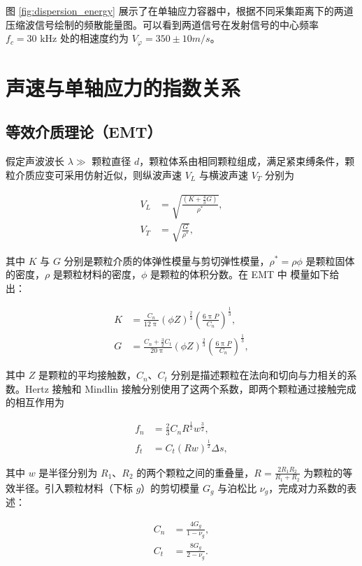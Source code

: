 图 \ref{fig:dispersion_energy} 展示了在单轴应力容器中，根据不同采集距离下的两道压缩波信号绘制的频散能量图。可以看到两道信号在发射信号的中心频率 $f_{c} = 30\text{ kHz}$ 处的相速度约为 $V_{\varphi} = 350\pm 10\unit{m/s}$。

\section{声速与单轴应力的指数关系}

\subsection{等效介质理论（EMT）}

假定声波波长 $\lambda\gg$ 颗粒直径 $d$，颗粒体系由相同颗粒组成，满足紧束缚条件，颗粒介质应变可采用仿射近似，则纵波声速 $V_{L}$ 与横波声速 $V_{T}$ 分别为

\begin{align}
  V_{L} &= \sqrt{\frac{(K+\frac{4}{3}G)}{\rho^{*}}},\\
  V_{T} &= \sqrt{\frac{G}{\rho^{*}}},
\end{align}

其中 $K$ 与 $G$ 分别是颗粒介质的体弹性模量与剪切弹性模量，$\rho^{*}=\rho\phi$ 是颗粒固体的密度，$\rho$ 是颗粒材料的密度，$\phi$ 是颗粒的体积分数。在 EMT 中 模量如下给出：

\begin{align}
  K &= \frac{C_{n}}{12\uppi}\left(\phi Z\right)^{\frac{2}{3}}\left(\frac{6\uppi P}{C_{n}}\right)^{\frac{1}{3}},\\
  G &= \frac{C_{n} + \frac{3}{2}C_{t}}{20\uppi}\left(\phi Z\right)^{\frac{2}{3}}\left(\frac{6\uppi P}{C_{n}}\right)^{\frac{1}{3}},
\end{align}

其中 $Z$ 是颗粒的平均接触数，$C_{n}$、$C_{t}$ 分别是描述颗粒在法向和切向与力相关的系数。Hertz 接触和 Mindlin 接触分别使用了这两个系数，即两个颗粒通过接触完成的相互作用为

\begin{align}
  f_{n} &= \frac{2}{3}C_{n}R^{\frac{1}{2}}w^{\frac{3}{2}},\\
  f_{t} &= C_{t}(Rw)^{\frac{1}{2}}\Delta s,
\end{align}

其中 $w$ 是半径分别为 $R_{1}$、$R_{2}$ 的两个颗粒之间的重叠量，$R = \frac{2R_{1}R_{2}}{R_{1} + R_{2}}$ 为颗粒的等效半径。引入颗粒材料（下标 $g$）的剪切模量 $G_{g}$ 与泊松比 $\nu_{g}$，完成对力系数的表述：

\begin{align}
  C_{n} &= \frac{4G_{g}}{1-\nu_{g}},\\
  C_{t} &= \frac{8G_{g}}{2-\nu_{g}}.
\end{align}

